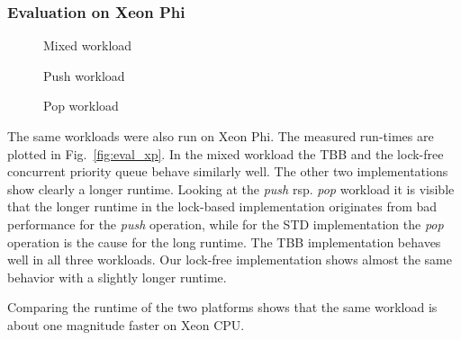 \subsubsection{Evaluation on Xeon Phi}
\begin{figure*}[t]
	\centering
	\begin{subfigure}[b]{0.3\textwidth}
		\centering
		
		\caption{Mixed workload}
		\label{fig:xp_mixed}
	\end{subfigure}
	\hfill
	\begin{subfigure}[b]{0.3\textwidth}
		\centering
		
		\caption{Push workload}
		\label{fig:xp_push}
	\end{subfigure}
	\hfill
	\begin{subfigure}[b]{0.3\textwidth}
		\centering
		
		\caption{Pop workload}
		\label{fig:xp_pop}
	\end{subfigure}
	\caption{Runtime for different workloads executed on a Xeon Phi while varying the number of threads}
	\label{fig:eval_xp}
\end{figure*}
The same workloads were also run on Xeon Phi. The measured run-times are plotted in Fig.~\ref{fig:eval_xp}.
In the mixed workload the TBB and the lock-free concurrent priority queue behave similarly well. The other two implementations show clearly a longer runtime.
Looking at the \textit{push} rsp. \textit{pop} workload it is visible that the longer runtime in the lock-based implementation originates from bad performance for the \textit{push} operation, while for the STD implementation the \textit{pop} operation is the cause for the long runtime.
The TBB implementation behaves well in all three workloads.
Our lock-free implementation shows almost the same behavior with a slightly longer runtime.

Comparing the runtime of the two platforms shows that the same workload is about one magnitude faster on Xeon CPU.


